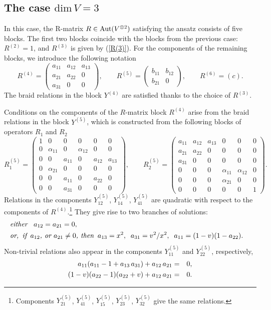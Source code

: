 \documentclass[11pt]{article}
\def\ba{\begin{eqnarray}}\def\ea{\end{eqnarray}}
\begin{document}
\subsection{The case $\mbox{dim}\, V = 3$}

In this case, the R-matrix $R\in {\rm Aut}(V^{\otimes 2})$ satisfying the ansatz consists of five blocks.
The first two blocks coincide with the blocks from the previous case: $R^{(2)}=1$, and $R^{(3)}$ is given by (\ref{R(3)}). 
For the components of the remaining blocks, we introduce the following notation
$$
R^{(4)} =\left(
\begin{array}{ccc}
a_{11} &	a_{12} & a_{13}
	\\
	a_{21} & 	a_{22} & 0
		\\
	a_{31} & 0& 0
\end{array}\right), \qquad
 R^{(5)} =\left(
\begin{array}{cc}
	b_{11} &	b_{12}
	\\
	b_{21} & 	 0
	\end{array}\right), \qquad
R^{(6)} =(c).
$$
The braid relations in the block $Y^{(4)}$ are satisfied thanks to the choice of $R^{(3)}$.  

Conditions on the components of the $R$-matrix block $R^{(4)}$
arise from the braid relations in the block $Y^{(5)}$, which is constructed from the following blocks of operators $R_1$ and $R_2$
$$
R_1^{(5)} =\left(
\begin{array}{cccccc}
	1 &	0 & 0 & 0 & 0&0
	\\
	0& 	\alpha_{11} & 0 & \alpha_{12}& 0&0
	\\
	0 & 0 & a_{11}&0 & a_{12} & a_{13}
		\\
	0& 	\alpha_{21} & 0 & 0& 0&0
		\\
	0 & 0 & a_{11}&0 & a_{22} & 0
		\\
	0 & 0 & a_{31}&0 & 0 & 0
\end{array}\right), \qquad
R_2^{(5)} =\left(
\begin{array}{cccccc}
	a_{11}&	a_{12} & a_{13} & 0 & 0&0
	\\
	a_{21}& a_{22} & 0 & 0& 0&0
	\\
	a_{31}& 0 & 0&0 &0 & 0
	\\
	0& 	0 & 0 & \alpha_{11}& \alpha_{12}&0
	\\
	0 & 0 & 0&\alpha_{21} &0 & 0
	\\
	0 & 0 & 0&0 & 0 & 1
\end{array}\right).
$$
Relations in the components $Y^{(5)}_{12}$, $Y^{(5)}_{14}$, $Y^{(5)}_{41}$  are quadratic with respect to the components of $R^{(4)}$.\footnote{Components $Y^{(5)}_{21}$, $Y^{(5)}_{41}$, $Y^{(5)}_{15}$, $Y^{(5)}_{23}$, $Y^{(5)}_{32}$ give the same relations.} They give rise to two branches of solutions:
\ba
\lb{b-a}
&
\mbox{\em either \,
	} a_{12}=a_{21}=0, &
\\
\lb{b-b} 
&
\mbox{\em or,\,
 if\,
$a_{12}$, or $a_{21}\neq 0$, then}\;\; a_{13}=x^2,\;\; a_{31}=v^2/x^2,\;\; a_{11}=(1-v)(1-a_{22}). &
\ea
Non-trivial relations also appear in the components $Y^{(5)}_{11}$ and $Y^{(5)}_{22}$, respectively,
\ba
\lb{b-c}
a_{11}(a_{11}-1+a_{13}\, a_{31})+a_{12}\,a_{21}&=&0,
\\
\lb{b-d} 
(1-v)(a_{22}-1)(a_{22}+v) +a_{12}\,a_{21}&=&0.
\ea
\end{document}
